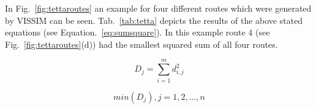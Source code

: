 \documentclass[master,english]{hgbthesis}
\begin{document}
In Fig.~\ref{fig:tettaroutes} an example for four different routes which were generated by VISSIM can be seen. Tab.~\ref{tab:tetta} depicts the results of the above stated equations (see Equation.\ \ref{eq:sumsquare}). In this example route 4 (see Fig.~\ref{fig:tettaroutes}(d)) had the smallest squared sum of all four routes. 

\begin{equation}

\label{eq:sumsquare}

D_j=\sum_{i=1}^{m} d_{i,j}^{2}

\end{equation}

\begin{equation}

\label{eq:minsum}

min(D_j), j = 1,2,\ldots,n

\end{equation}
\end{document}
